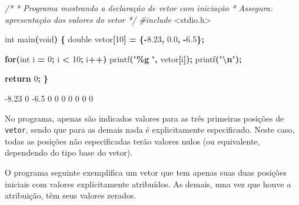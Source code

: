 \documentclass[
  11pt,
  a4paper,
]{scrbook}
\newenvironment{Shaded}{\begin{snugshade}}{\end{snugshade}}
\newcommand{\CommentTok}[1]{\textcolor[rgb]{0.56,0.35,0.01}{\textit{#1}}}
\newcommand{\ControlFlowTok}[1]{\textcolor[rgb]{0.13,0.29,0.53}{\textbf{#1}}}
\newcommand{\DataTypeTok}[1]{\textcolor[rgb]{0.13,0.29,0.53}{#1}}
\newcommand{\DecValTok}[1]{\textcolor[rgb]{0.00,0.00,0.81}{#1}}
\newcommand{\FloatTok}[1]{\textcolor[rgb]{0.00,0.00,0.81}{#1}}
\newcommand{\ImportTok}[1]{#1}
\newcommand{\NormalTok}[1]{#1}
\newcommand{\OperatorTok}[1]{\textcolor[rgb]{0.81,0.36,0.00}{\textbf{#1}}}
\newcommand{\PreprocessorTok}[1]{\textcolor[rgb]{0.56,0.35,0.01}{\textit{#1}}}
\newcommand{\SpecialCharTok}[1]{\textcolor[rgb]{0.81,0.36,0.00}{\textbf{#1}}}
\newcommand{\StringTok}[1]{\textcolor[rgb]{0.31,0.60,0.02}{#1}}
\begin{document}
\begin{Shaded}
\begin{Highlighting}[]
\CommentTok{/*}
\CommentTok{ * Programa mostrando a declaração de vetor com iniciação}
\CommentTok{ * Assegura: apresentação dos valores do vetor}
\CommentTok{ */}
\PreprocessorTok{\#include }\ImportTok{\textless{}stdio.h\textgreater{}}

\DataTypeTok{int}\NormalTok{ main}\OperatorTok{(}\DataTypeTok{void}\OperatorTok{)} \OperatorTok{\{}
    \DataTypeTok{double}\NormalTok{ vetor}\OperatorTok{[}\DecValTok{10}\OperatorTok{]} \OperatorTok{=} \OperatorTok{\{{-}}\FloatTok{8.23}\OperatorTok{,} \FloatTok{0.0}\OperatorTok{,} \OperatorTok{{-}}\FloatTok{6.5}\OperatorTok{\};}

    \ControlFlowTok{for}\OperatorTok{(}\DataTypeTok{int}\NormalTok{ i }\OperatorTok{=} \DecValTok{0}\OperatorTok{;}\NormalTok{ i }\OperatorTok{\textless{}} \DecValTok{10}\OperatorTok{;}\NormalTok{ i}\OperatorTok{++)}
\NormalTok{        printf}\OperatorTok{(}\StringTok{"}\SpecialCharTok{\%g}\StringTok{ "}\OperatorTok{,}\NormalTok{ vetor}\OperatorTok{[}\NormalTok{i}\OperatorTok{]);}
\NormalTok{    printf}\OperatorTok{(}\StringTok{"}\SpecialCharTok{\textbackslash{}n}\StringTok{"}\OperatorTok{);}

    \ControlFlowTok{return} \DecValTok{0}\OperatorTok{;}
\OperatorTok{\}}
\end{Highlighting}
\end{Shaded}

\begin{Shaded}
\begin{Highlighting}[]
\NormalTok{{-}8.23 0 {-}6.5 0 0 0 0 0 0 0 }
\end{Highlighting}
\end{Shaded}

No programa, apenas são indicados valores para as três primeiras
posições de \texttt{vetor}, sendo que para as demais nada é
explicitamente especificado. Neste caso, todas as posições não
especificadas terão valores nulos (ou equivalente, dependendo do tipo
base do vetor).

O programa seguinte exemplifica um vetor que tem apenas suas duas
posições iniciais com valores explicitamente atribuídos. As demais, uma
vez que houve a atribuição, têm seus valores zerados.
\end{document}
